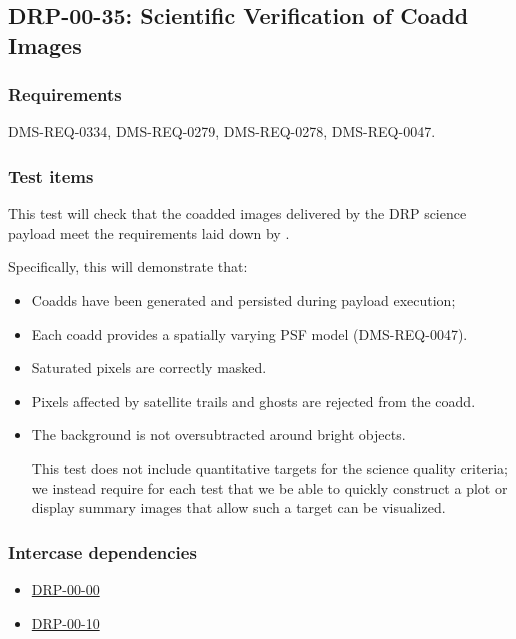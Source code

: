 \subsection{DRP-00-35: Scientific Verification of Coadd Images}
\label{drp-00-35}

\subsubsection{Requirements}

DMS-REQ-0334, DMS-REQ-0279, DMS-REQ-0278, DMS-REQ-0047.

\subsubsection{Test items}
\label{drp-00-35-items}

This test will check that the coadded images  delivered by the DRP science
payload meet the requirements laid down by .

Specifically, this will demonstrate that:

\begin{itemize}

  \item{Coadds have been generated and persisted during payload execution;}
  \item{Each coadd provides a spatially varying PSF model (DMS-REQ-0047).}
  \item{Saturated pixels are correctly masked.}
  \item{Pixels affected by satellite trails and ghosts are rejected from the coadd.}
  \item{The background is not oversubtracted around bright objects.}

This test does not include quantitative targets for the science quality criteria; we instead require for each test that we be able to quickly construct a plot or display summary images that allow such a target can be visualized.

\end{itemize}

\subsubsection{Intercase dependencies}

\begin{itemize}

  \item{\hyperref[drp-00-00]{DRP-00-00}}
  \item{\hyperref[drp-00-10]{DRP-00-10}}

\end{itemize}

